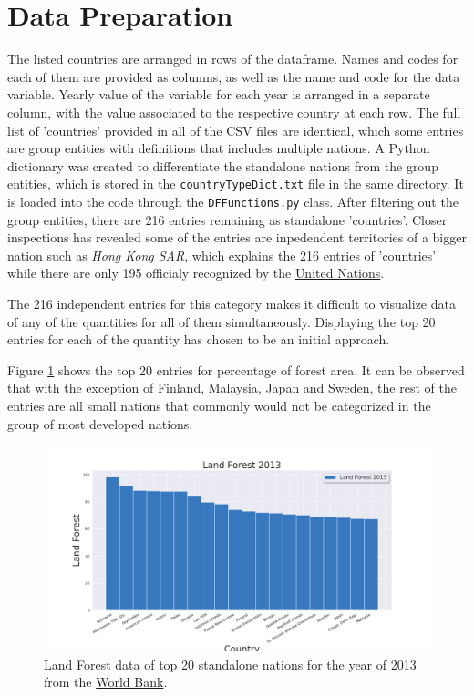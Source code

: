 \documentclass[11pt,a4paper,titlepage]{article}
\newcommand{\blankline}{\quad\pagebreak[2]}
\begin{document}
\section{Data Preparation}

The listed countries are arranged in rows of the dataframe. Names and codes for each of them are provided as columns, as well as the name and code for the data variable. Yearly value of the variable for each year is arranged in a separate column, with the value associated to the respective country at each row. The full list of 'countries' provided in all of the CSV files are identical, which some entries are group entities with definitions that includes multiple nations. A Python dictionary was created to differentiate the standalone nations from the group entities, which is stored in the \texttt{countryTypeDict.txt} file in the same directory. It is loaded into the code through the \texttt{DFFunctions.py} class. After filtering out the group entities, there are 216 entries remaining as standalone 'countries'. Closer inspections has revealed some of the entries are inpedendent territories of a bigger nation such as \textit{Hong Kong SAR}, which explains the 216 entries of 'countries' while there are only 195 officialy recognized by the \href{http://www.un.org/en/index.html}{United Nations}.

\blankline

The 216 independent entries for this category makes it difficult to visualize data of any of the quantities for all of them simultaneously. Displaying the top 20 entries for each of the quantity has chosen to be an initial approach.

\blankline

Figure \ref{fig:LandForest2013} shows the top 20 entries for percentage of forest area. It can be observed that with the exception of Finland, Malaysia, Japan and Sweden, the rest of the entries are all small nations that commonly would not be categorized in the group of most developed nations.

\begin{figure}[!htbp]
    \begin{center}
        \includegraphics[width=\textwidth]{../Plots/LandForest_2013.png}
        \caption{Land Forest data of top 20 standalone nations for the year of 2013 from the \href{https://www.worldbank.org/}{World Bank}.}
        \label{fig:LandForest2013}
    \end{center}
\end{figure}
\end{document}
